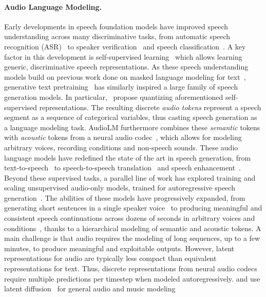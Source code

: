 \paragraph{Audio Language Modeling.}
Early developments in speech foundation models have improved speech understanding across many discriminative tasks, from automatic speech recognition (ASR)~\citep{wav2vec2,whisper,google_usm} to speaker verification~\citep{wavlm} and speech classification~\citep{superb}. A key factor in this development is self-supervised learning~\citep{hubert, wav2vec2,wavlm} which allows learning generic, discriminative speech representations. As these speech understanding models build on previous work done on masked language modeling for text~\citep{bert}, generative text pretraining~\citep{gpt} has similarly inspired a large family of speech generation models. In particular,~\citet{gslm} propose quantizing aforementioned self-supervised representations. The resulting discrete \textit{audio tokens} represent a speech segment as a sequence of categorical variables, thus casting speech generation as a language modeling task. AudioLM \citep{audiolm} furthermore combines these \textit{semantic} tokens with \textit{acoustic} tokens from a neural audio codec~\citep{soundstream}, which allows for modeling arbitrary voices, recording conditions and non-speech sounds.  These audio language models have redefined the state of the art in speech generation, from text-to-speech~\citep{valle, spear_tts} to speech-to-speech translation~\citep{audiopalm, gemini_1.5} and speech enhancement~\citep{uniaudio}. Beyond these supervised tasks, a parallel line of work has explored training and scaling unsupervised audio-only models, trained for autoregressive speech generation~\citep{zerospeech21,gslm,audiolm}. The abilities of these models have progressively expanded, from generating short sentences in a single speaker voice~\citep{gslm} to producing meaningful and consistent speech continuations across dozens of seconds in arbitrary voices and conditions~\citep{audiolm}, thanks to a hierarchical modeling of semantic and acoustic tokens. A main challenge is that audio requires the modeling of long sequences, up to a few minutes, to produce meaningful and exploitable outputs. However, latent representations for audio are typically less compact than equivalent representations for text. Thus, discrete representations from neural audio codecs require multiple predictions per timestep when modeled autoregressively. \citep{liu2023audioldm} and \citep{evans2024stable} use latent diffusion~\citep{ho2020denoising} for general audio and music modeling

